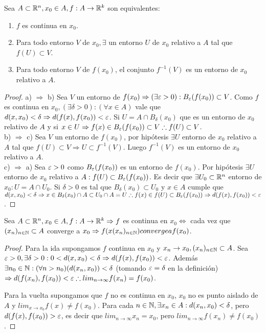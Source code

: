 \begin{prop}
  Sea $A \subset \mathbb{R}^n, x_0 \in A, f: A \to \mathbb{R}^k$ son equivalentes:
  \begin{enumerate}
    \item $f$ es continua en $x_0$.
    \item Para todo entorno $V$ de $x_0, \exists$ un entorno $U$ de $x_0$ relativo a $A$ tal que $f(U) \subset V$.
    \item Para todo entorno $V$ de $f(x_0)$, el conjunto $f^{-1}(V)$ es un entorno de $x_0$ relativo a $A$.
  \end{enumerate}

  \begin{proof}
    a) $\Rightarrow$ b) Sea $V$ un entorno de $f(x_0) \Rightarrow (\exists \varepsilon > 0) : B_{\varepsilon}(f(x_0)) \subset V$. Como $f$ es continua en $x_0, (\exists \delta > 0) : (\forall x \in A)$ vale que $d(x, x_0) < \delta \Rightarrow d(f(x), f(x_0)) < \varepsilon$. Si $U = A \cap B_{\delta}(x_0)$ que es un entorno de $x_0$ relativo de $A$ y si $x \in U \Rightarrow f(x) \in B_{\varepsilon}(f(x_0)) \subset V \therefore f(U) \subset V$. \\
    b) $\Rightarrow$ c) Sea $V$ un entorno de $f(x_0)$, por hipótesis $\exists U$ entorno de $x_0$ relativo a $A$ tal que $f(U) \subset V \Rightarrow U \subset f^{-1}(V)$. Luego $f^{-1}(V)$ es un entorno de $x_0$ relativo a $A$. \\
    c) $\Rightarrow$ a) Sea $\varepsilon > 0$ como $B_{\varepsilon}(f(x_0))$ es un entorno de $f(x_0)$. Por hipótesis $\exists U$ entorno de $x_0$ relativo a $A : f(U) \subset B_{\varepsilon}(f(x_0))$. Es decir que $\exists U_0 \subset \mathbb{R}^n$ entorno de $x_0 : U = A \cap U_0$. Si $\delta > 0$ es tal que $B_{\delta}(x_0) \subset U_0$ y $x \in A$ cumple que $d(x, x_0) < \delta \Rightarrow x \in B_{\delta}(x_0) \cap A \subset U_0 \cap A = U \therefore f(x) \in f(U) \subset B_{\varepsilon}(f(x_0))  \Rightarrow d(f(x), f(x_0)) < \varepsilon$.
  \end{proof}
\end{prop}

\begin{prop}
  Sea $A \subset \mathbb{R}^n, x_0 \in A, f: A \to \mathbb{R}^k \Rightarrow f$ es continua en $x_0 \iff$ cada vez que $(x_n)_{n \in \mathbb{N}} \subset A$ converge a $x_0 \Rightarrow f(x(x_n)_{n \in \mathbb{N}}) converge a f(x_0)$.
  \begin{proof}
    Para la ida supongamos $f$ continua en $x_0$ y $x_n \to x_0, (x_n)_{n \in \mathbb{N}} \subset A$. Sea $\varepsilon > 0, \exists \delta > 0 : 0 < d(x, x_0) < \delta \Rightarrow d(f(x), f(x_0)) < \varepsilon$.
    Además $\exists n_0 \in \mathbb{N} : (\forall n > n_0)(d(x_n, x_0)) < \delta$ (tomando $\varepsilon = \delta$ en la definición) $\Rightarrow d(f(x_n), f(x_0)) < \varepsilon \therefore lim_{n \to \infty} f(x_n) = f(x_0)$.

    Para la vuelta supongamos que $f$ no es continua en $x_0$, $x_0$ no es punto aislado de $A$ y $lim_{x \to x_0} f(x) \neq f(x_0)$. Para cada $n \in \mathbb{N}, \exists x_n \in A : d(x_n, x_0) < \delta$, pero $d(f(x), f(x_0)) > \varepsilon$, es decir que $lim_{n \to \infty} x_n = x_0$, pero $lim_{n \to \infty} f(x_n) \neq f(x_0)$.
  \end{proof}
\end{prop}

